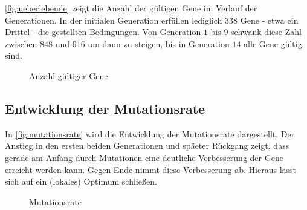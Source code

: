 \autoref{fig:ueberlebende} zeigt die Anzahl der gültigen Gene im Verlauf der Generationen.
In der initialen Generation erfüllen lediglich $338$ Gene - etwa ein Drittel - die gestellten Bedingungen.
Von Generation $1$ bis $9$ schwank diese Zahl zwischen $848$ und $916$ um dann zu steigen,
 bis in Generation $14$ alle Gene gültig sind.

\begin{figure}[ht]
    \centering
	\caption{Anzahl gültiger Gene}
	\label{fig:ueberlebende}
\end{figure}

\subsection{Entwicklung der Mutationsrate}

In \autoref{fig:mutationsrate} wird die Entwicklung der Mutationsrate dargestellt.
Der Anstieg in den ersten beiden Generationen und späeter Rückgang zeigt,
dass gerade am Anfang durch Mutationen eine deutliche Verbesserung der Gene erreicht werden kann.
Gegen Ende nimmt diese Verbesserung ab. Hieraus lässt sich auf ein (lokales) Optimum schließen.

\begin{figure}[ht]
    \centering
    \caption{Mutationsrate}
    \label{fig:mutationsrate}
\end{figure}

